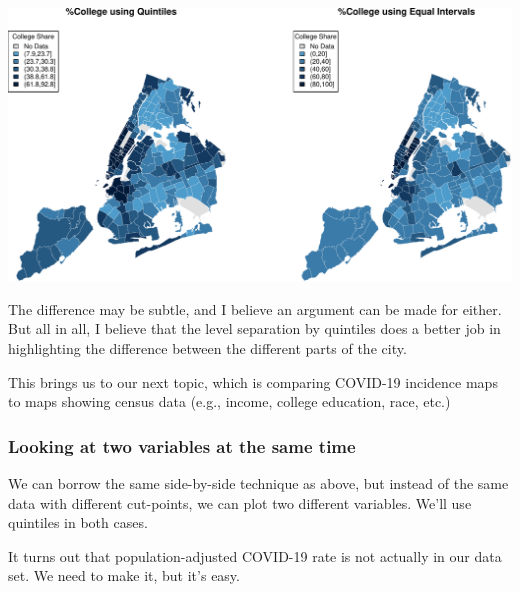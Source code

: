 \documentclass[openany]{book}
\newenvironment{Shaded}{\begin{snugshade}}{\end{snugshade}}
\newcommand{\DataTypeTok}[1]{\textcolor[rgb]{0.13,0.29,0.53}{#1}}
\newcommand{\DecValTok}[1]{\textcolor[rgb]{0.00,0.00,0.81}{#1}}
\newcommand{\KeywordTok}[1]{\textcolor[rgb]{0.13,0.29,0.53}{\textbf{#1}}}
\newcommand{\NormalTok}[1]{#1}
\newcommand{\OperatorTok}[1]{\textcolor[rgb]{0.81,0.36,0.00}{\textbf{#1}}}
\newcommand{\StringTok}[1]{\textcolor[rgb]{0.31,0.60,0.02}{#1}}
\begin{document}
\begin{center}\includegraphics[width=0.9\linewidth]{figs/unnamed-chunk-93-1} \end{center}

The difference may be subtle, and I believe an argument can be made for either. But all in all, I believe that the level separation by quintiles does a better job in highlighting the difference between the different parts of the city.

This brings us to our next topic, which is comparing COVID-19 incidence maps to maps showing census data (e.g., income, college education, race, etc.)

\hypertarget{looking-at-two-variables-at-the-same-time}{%
\subsubsection*{Looking at two variables at the same time}\label{looking-at-two-variables-at-the-same-time}}

We can borrow the same side-by-side technique as above, but instead of the same data with different cut-points, we can plot two different variables. We'll use quintiles in both cases.

It turns out that population-adjusted COVID-19 rate is not actually in our data set. We need to make it, but it's easy.

\begin{Shaded}
\end{Shaded}
\end{document}
